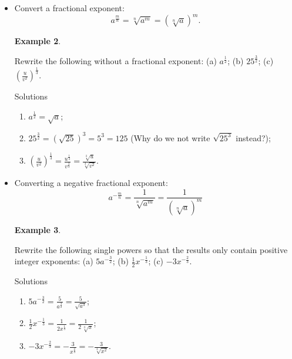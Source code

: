 \documentclass[
]{book}
\providecommand{\tightlist}{%
  \setlength{\itemsep}{0pt}\setlength{\parskip}{0pt}}
\theoremstyle{definition}
\theoremstyle{definition}
\newtheorem{example}{Example}[chapter]
\theoremstyle{definition}
\theoremstyle{definition}
\theoremstyle{remark}
\begin{document}
\begin{itemize}
\begin{itemize}
\begin{example}
    \end{example}
  \item
    Convert a fractional exponent:
    \[a^{\frac{m}{n}} = \sqrt[n]{a^m} = \left(\sqrt[n]{a}\right)^m .\]

    \begin{example}
    \protect\hypertarget{exm:frac-exp}{}\label{exm:frac-exp}

    Rewrite the following without a fractional exponent: (a) \(a^{\frac{1}{2}}\); (b) \(25^{\frac{3}{2}}\); (c) \(\displaystyle \left(\frac{u}{v^2}\right)^\frac{1}{3}\).

    Solutions

    \begin{enumerate}
    \def\labelenumi{(\alph{enumi})}
    \tightlist
    \item
      \(\displaystyle a^{\frac{1}{2}} = \sqrt{a}\);
    \item
      \(\displaystyle 25^{\frac{3}{2}} = \left(\sqrt{25}\right)^3 = 5^3 = 125\) (Why do we not write \(\sqrt{25^3}\) instead?);
    \item
      \(\displaystyle \left(\frac{u}{v^2}\right)^\frac{1}{3} = \frac{u^\frac{1}{3}}{v^\frac{2}{3}} = \frac{\sqrt[3]{u}}{\sqrt[3]{v^2}}\).
    \end{enumerate}

    \end{example}
  \item
    Converting a negative fractional exponent:
    \[a^{-\frac{m}{n}} = \frac{1}{\sqrt[n]{a^m}} = \frac{1}{\left(\sqrt[n]{a}\right)^m}\]

    \begin{example}
    \protect\hypertarget{exm:neg-frac-exp}{}\label{exm:neg-frac-exp}

    Rewrite the following single powers so that the results only contain positive integer exponents: (a) \(5a^{-\frac{3}{2}}\); (b) \(\displaystyle \frac{1}{2}x^{-\frac{1}{3}}\); (c) \(-3x^{-\frac{2}{3}}\).

    Solutions

    \begin{enumerate}
    \def\labelenumi{(\alph{enumi})}
    \tightlist
    \item
      \(\displaystyle 5a^{-\frac{3}{2}} = \frac{5}{a^{\frac{3}{2}}} = \frac{5}{\sqrt{a^3}}\);
    \item
      \(\displaystyle \frac{1}{2}x^{-\frac{1}{3}} = \frac{1}{2x^\frac{1}{3}} = \frac{1}{2\, \sqrt[3]{x}}\);
    \item
      \(\displaystyle -3x^{-\frac{2}{3}} = -\frac{3}{x^\frac{2}{3}} = -\frac{3}{\sqrt[3]{x^2}}\).
    \end{enumerate}


\end{example}
\end{itemize}
\end{itemize}
\end{document}
